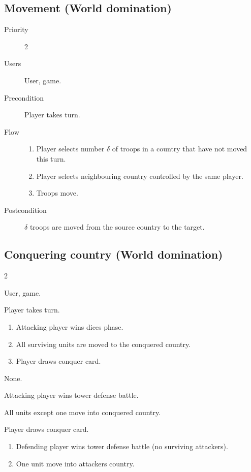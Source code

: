 \documentclass[12pt,a4paper]{article}
\begin{document}
\subsection{Movement (World domination)}
\begin{description}
\item[Priority] 2
\item[Users] User, game.
\item[Precondition] Player takes turn.
\item[Flow]\mbox{}
  \begin{enumerate}
  \item Player selects number $\delta$ of troops in a country that have not moved
    this turn.
  \item Player selects neighbouring country controlled by the same
    player.
  \item Troops move.
  \end{enumerate}
\item[Postcondition] $\delta$ troops are moved from the source country
  to the target.
\end{description}

\subsection{Conquering country (World domination)}
\begin{description}
\item[Priority] 2
\item[Users] User, game.
\item[Precondition] Player takes turn.
\item[Flow]\mbox{}
  \begin{enumerate}
  \item Attacking player wins dices phase.
  \item All surviving units are moved to the conquered country.
  \item Player draws conquer card.
  \end{enumerate}
\item[Postcondition] None.
\item[Alternative Flow 1]\mbox{}
  \item Attacking player wins tower defense battle.
  \item All units except one move into conquered country.
  \item Player draws conquer card.
\item[Alternative Flow 2]\mbox{}
  \begin{enumerate}
  \item Defending player wins tower defense battle (no surviving
    attackers).
  \item One unit move into attackers country.
  \end{enumerate}
\end{description}
\end{document}
